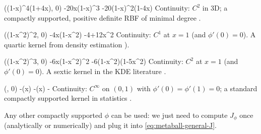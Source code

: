 { \max\left((1-x)^4(1+4x), 0\right) }
{ -20x(1-x)^3 }
{ -20(1-x)^2(1-4x) }
{  }
{  }
{Continuity: $C^2$ in 3D; a compactly supported, positive definite RBF of minimal degree \cite{Wendland1995}.}

{ \max\left((1-x^2)^2, 0\right) }
{ -4x(1-x^2) }
{ -4+12x^2 }
{  }
{  }
{Continuity: $C^1$ at $x=1$ (and $\phi'(0)=0$). A quartic kernel from density estimation \cite{Silverman1998, Wand1993}).}

{ \max\left((1-x^2)^3, 0\right) }
{ -6x(1-x^2)^2 }
{ -6(1-x^2)(1-5x^2) }
{  }
{  }
{Continuity: $C^2$ at $x=1$ (and $\phi'(0)=0$). A sextic kernel in the KDE literature \cite{Silverman1998,Wand1993}.}

{ \max\left(, 0\right) }
{ -\sin(\pi x) }
{ -\cos(\pi x) }
{ - }
{  }
{Continuity: $C^\infty$ on $(0,1)$ with $\phi'(0)=\phi'(1)=0$; a standard compactly supported kernel in statistics \cite{Soh2013}.}

Any other compactly supported $\phi$ can be used: we just need to compute $J_\phi$ once (analytically or numerically) and plug it into \eqref{eq:metaball-general-J}.

















